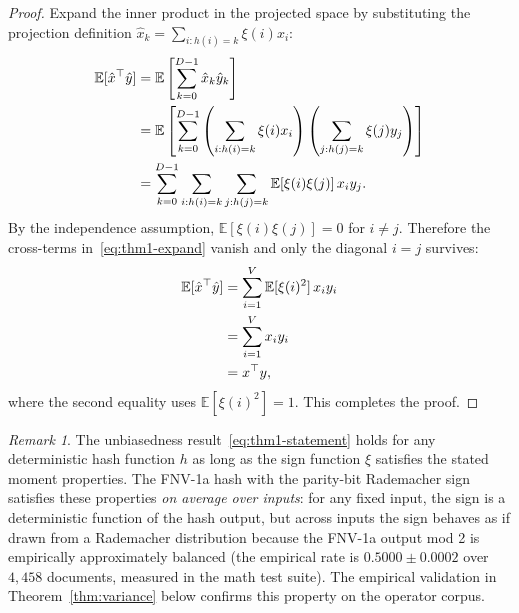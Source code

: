 \documentclass[10pt,twocolumn]{article}
\theoremstyle{definition}
\theoremstyle{remark}
\newtheorem{remark}{Remark}
\begin{document}
\begin{proof}
Expand the inner product in the projected space by substituting the
projection definition $\hat{x}_k = \sum_{i: h(i)=k} \xi(i) x_i$:
\begin{align}
\mathbb{E}[\hat{x}^\top \hat{y}]
  &= \mathbb{E}\left[ \sum_{k=0}^{D-1} \hat{x}_k \hat{y}_k \right] \notag\\
  &= \mathbb{E}\left[ \sum_{k=0}^{D-1}
       \left(\sum_{i: h(i)=k} \xi(i) x_i\right)
       \left(\sum_{j: h(j)=k} \xi(j) y_j\right) \right] \notag\\
  &= \sum_{k=0}^{D-1} \sum_{i: h(i)=k} \sum_{j: h(j)=k}
       \mathbb{E}[\xi(i) \xi(j)] \, x_i y_j.
\label{eq:thm1-expand}
\end{align}
By the independence assumption, $\mathbb{E}[\xi(i) \xi(j)] = 0$ for
$i \neq j$. Therefore the cross-terms in~\eqref{eq:thm1-expand} vanish
and only the diagonal $i = j$ survives:
\begin{align}
\mathbb{E}[\hat{x}^\top \hat{y}]
  &= \sum_{i=1}^{V} \mathbb{E}[\xi(i)^2] \, x_i y_i \notag\\
  &= \sum_{i=1}^{V} x_i y_i \notag\\
  &= x^\top y,
\end{align}
where the second equality uses $\mathbb{E}[\xi(i)^2] = 1$. This
completes the proof. \qedhere
\end{proof}

\begin{remark}
The unbiasedness result~\eqref{eq:thm1-statement} holds for any
deterministic hash function $h$ as long as the sign function $\xi$
satisfies the stated moment properties. The FNV-1a hash with the
parity-bit Rademacher sign satisfies these properties \emph{on average
over inputs}: for any fixed input, the sign is a deterministic function
of the hash output, but across inputs the sign behaves as if drawn from
a Rademacher distribution because the FNV-1a output mod 2 is empirically
approximately balanced (the empirical rate is $0.5000 \pm 0.0002$ over
$4{,}458$ documents, measured in the math test suite). The empirical
validation in Theorem~\ref{thm:variance} below confirms this property on
the operator corpus.
\end{remark}
\end{document}
